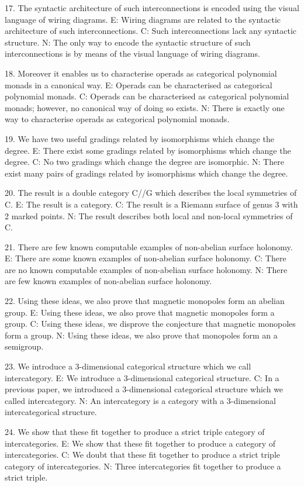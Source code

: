 17. The syntactic architecture of such interconnections is encoded using the visual language of wiring diagrams.
E: Wiring diagrams are related to the syntactic architecture of such interconnections.
C: Such interconnections lack any syntactic structure.
N: The only way to encode the syntactic structure of such interconnections is by means of the visual language of wiring diagrams.

18.  Moreover it enables us to characterise operads as categorical polynomial monads in a canonical way.
E: Operads can be characterised as categorical polynomial monads.
C: Operads can be characterised as categorical polynomial monads; however, no canonical way of doing so exists.
N: There is exactly one way to characterise operads as categorical polynomial monads.

19. We have two useful gradings related by isomorphisms which change the degree.
E: There exist some gradings related by isomorphisms which change the degree.
C: No two gradings which change the degree are isomorphic.
N: There exist many pairs of gradings related by isomorphisms which change the degree.

20.  The result is a double category C//G which describes the local symmetries of C.
E: The result is a category.
C: The result is a Riemann surface of genus 3 with 2 marked points.
N: The result describes both local and non-local symmetries of C.

21. There are few known computable examples of non-abelian surface holonomy.
E: There are some known examples of non-abelian surface holonomy.
C: There are no known computable examples of non-abelian surface holonomy.
N: There are few known examples of non-abelian surface holonomy.

22. Using these ideas, we also prove that magnetic monopoles form an abelian group.
E:  Using these ideas, we also prove that magnetic monopoles form a group.
C:  Using these ideas, we disprove the conjecture that magnetic monopoles form a group.
N: Using these ideas, we also prove that monopoles form an a semigroup.

23.  We introduce a 3-dimensional categorical structure which we call intercategory.
E: We introduce a 3-dimensional categorical structure.
C: In a previous paper, we introduced a 3-dimensional categorical structure which we called intercategory.
N: An intercategory is a category with a 3-dimensional intercategorical structure.

24. We show that these fit together to produce a strict triple category of intercategories.
E: We show that these fit together to produce a category of intercategories.
C: We doubt that these fit together to produce a strict triple category of intercategories.
N: Three intercategories fit together to produce a strict triple.

